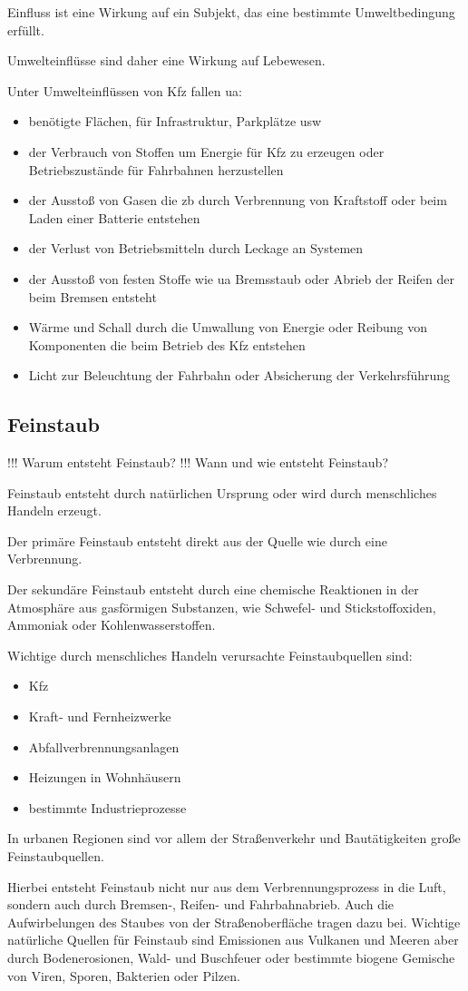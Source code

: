 Einfluss ist eine Wirkung auf ein Subjekt, das eine bestimmte Umweltbedingung erfüllt.

Umwelteinflüsse sind daher eine Wirkung auf Lebewesen.

\vspace{.5cm}
Unter Umwelteinflüssen von \ac{Kfz} fallen \ac{ua}:
\begin{itemize}
	\item benötigte Flächen, für Infrastruktur, Parkplätze \ac{usw}
	\item der Verbrauch von Stoffen um Energie für \ac{Kfz} zu erzeugen oder Betriebszustände für Fahrbahnen herzustellen
	\item der Ausstoß von Gasen die \ac{zb} durch Verbrennung von Kraftstoff oder beim Laden einer Batterie entstehen
	\item der Verlust von Betriebsmitteln durch Leckage an Systemen
	\item der Ausstoß von festen Stoffe wie \ac{ua} Bremsstaub oder Abrieb der Reifen der beim Bremsen entsteht
	\item Wärme und Schall durch die Umwallung von Energie oder Reibung von Komponenten die beim Betrieb des \ac{Kfz} entstehen
	\item Licht zur Beleuchtung der Fahrbahn oder Absicherung der Verkehrsführung
\end{itemize}


\subsection{Feinstaub}
!!! Warum entsteht Feinstaub?
!!! Wann und wie entsteht Feinstaub?


Feinstaub entsteht durch natürlichen Ursprung oder wird durch menschliches Handeln erzeugt.


Der primäre Feinstaub entsteht direkt aus der Quelle wie durch eine Verbrennung.  

Der sekundäre Feinstaub entsteht durch eine chemische Reaktionen in der Atmosphäre aus gasförmigen Substanzen, 
wie Schwefel- und Stickstoffoxiden, Ammoniak oder Kohlenwasserstoffen.

Wichtige durch menschliches Handeln verursachte Feinstaubquellen sind: 
\begin{itemize}
	\item \ac{Kfz}
	\item Kraft- und Fernheizwerke
	\item Abfallverbrennungsanlagen
	\item Heizungen in Wohnhäusern
	\item bestimmte Industrieprozesse
\end{itemize}

In urbanen Regionen sind vor allem der Straßenverkehr und Bautätigkeiten große Feinstaubquellen.

Hierbei entsteht Feinstaub nicht nur aus dem Verbrennungsprozess in die Luft, sondern auch durch Bremsen-, Reifen- und Fahrbahnabrieb. 
Auch die Aufwirbelungen des Staubes von der Straßenoberfläche tragen dazu bei. 
Wichtige natürliche Quellen für Feinstaub sind Emissionen aus Vulkanen und Meeren aber durch Bodenerosionen, Wald- und Buschfeuer oder 
bestimmte biogene Gemische von Viren, Sporen, Bakterien oder Pilzen.


